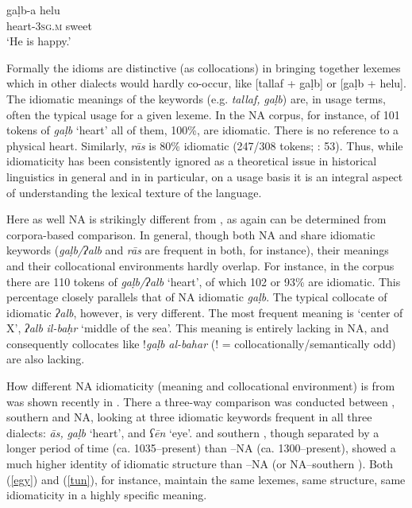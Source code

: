 \documentclass[output=paper]{langsci/langscibook}
\begin{document}
\ex
\gll gaḷb-a helu\\
     heart-\textsc{3sg.m} sweet\\
\glt ‘He is happy.’\label{helu}
\z
\z

Formally the {idioms} are distinctive (as  collocations) in bringing together lexemes which in other dialects would hardly co-occur, like [tallaf + gaḷb] or [gaḷb + helu]. The {idiomatic} meanings of the keywords (e.g. \textit{tallaf,} \textit{gaḷb}) are, in usage terms, often the typical usage for a given lexeme. In the NA corpus, for instance, of 101 tokens of \textit{gaḷb} ‘heart’ all of them, 100\%, are {idiomatic}. There is no reference to a physical heart. Similarly, \textit{rās} is 80\% {idiomatic} (247/308 tokens; \citealt{Ritt-Benmimounetc2017}: 53). Thus, while {idiomaticity} has been consistently ignored as a theoretical issue in historical linguistics in general and in  in particular, on a usage basis it is an integral aspect of understanding the lexical texture of the language.


Here as well NA is strikingly different from , as again can be determined from corpora-based comparison. In general, though both NA and  share {idiomatic} keywords (\textit{gaḷb/ʔalb} and \textit{rās} are frequent in both, for instance), their meanings and their collocational environments hardly overlap. For instance, in the  corpus there are 110 tokens of \textit{gaḷb/ʔalb} ‘heart’, of which 102 or 93\% are {idiomatic}. This percentage closely parallels that of NA {idiomatic} \textit{gaḷb}. The typical  {collocate} of {idiomatic} \textit{ʔalb}, however, is very different. The most frequent meaning is ‘center of X’, \textit{ʔalb} \textit{il-baḥr} ‘middle of the sea’. This meaning is entirely lacking in NA, and consequently {collocates} like !\textit{gaḷb} \textit{al-bahar} (! = collocationally/semantically odd) are also lacking.

How different NA {idiomaticity} (meaning and collocational environment) is from  was shown recently in \citet{Ritt-Benmimounetc2017}. There a three-way comparison was conducted between , southern   and NA, looking at three {idiomatic} keywords frequent in all three dialects: \textit{{\R}ās,} \textit{gaḷb} ‘heart’, and \textit{ʕēn} ‘eye’.  and southern , though separated by a longer period of time (ca. 1035–present) than –NA (ca. 1300–present), showed a much higher {identity} of {idiomatic} structure than –NA (or NA–southern ). Both  (\ref{egy}) and   (\ref{tun}), for instance, maintain the same lexemes, same structure, same {idiomaticity} in a highly specific meaning.
\end{document}
